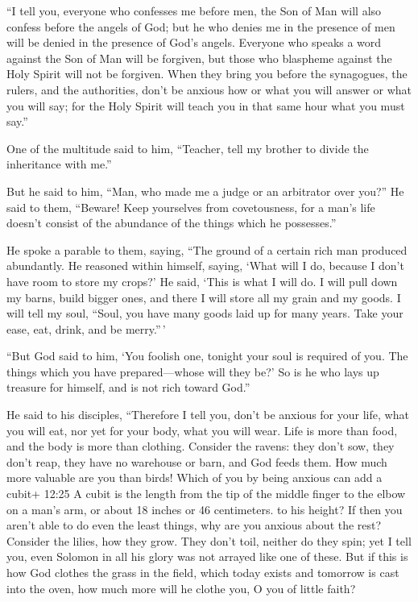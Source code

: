  ``I tell you, everyone who confesses me before men, the Son
of Man will also confess before the angels of God;  but he
who denies me in the presence of men will be denied in the presence of
God's angels.  Everyone who speaks a word against the Son
of Man will be forgiven, but those who blaspheme against the Holy Spirit
will not be forgiven.  When they bring you before the
synagogues, the rulers, and the authorities, don't be anxious how or
what you will answer or what you will say;  for the Holy
Spirit will teach you in that same hour what you must say.''

 One of the multitude said to him, ``Teacher, tell my
brother to divide the inheritance with me.''

 But he said to him, ``Man, who made me a judge or an
arbitrator over you?''  He said to them, ``Beware! Keep
yourselves from covetousness, for a man's life doesn't consist of the
abundance of the things which he possesses.''

 He spoke a parable to them, saying, ``The ground of a
certain rich man produced abundantly.  He reasoned within
himself, saying, `What will I do, because I don't have room to store my
crops?'  He said, `This is what I will do. I will pull down
my barns, build bigger ones, and there I will store all my grain and my
goods.  I will tell my soul, ``Soul, you have many goods
laid up for many years. Take your ease, eat, drink, and be merry.''\,'

 ``But God said to him, `You foolish one, tonight your soul
is required of you. The things which you have prepared---whose will they
be?'  So is he who lays up treasure for himself, and is not
rich toward God.''

 He said to his disciples, ``Therefore I tell you, don't be
anxious for your life, what you will eat, nor yet for your body, what
you will wear.  Life is more than food, and the body is
more than clothing.  Consider the ravens: they don't sow,
they don't reap, they have no warehouse or barn, and God feeds them. How
much more valuable are you than birds!  Which of you by
being anxious can add a cubit+ 12:25 A cubit is the length from the tip
of the middle finger to the elbow on a man's arm, or about 18 inches or
46 centimeters. to his height?  If then you aren't able to
do even the least things, why are you anxious about the rest?
 Consider the lilies, how they grow. They don't toil,
neither do they spin; yet I tell you, even Solomon in all his glory was
not arrayed like one of these.  But if this is how God
clothes the grass in the field, which today exists and tomorrow is cast
into the oven, how much more will he clothe you, O you of little faith?

